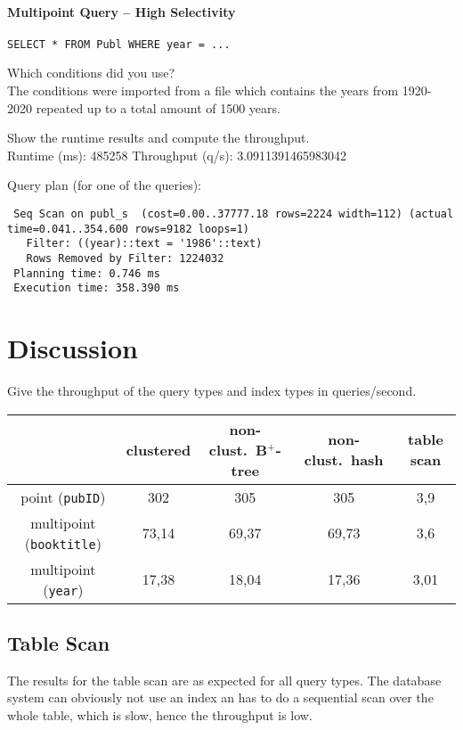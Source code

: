 \documentclass[11pt]{scrartcl}
\begin{document}
\paragraph{Multipoint Query -- High Selectivity}

{\small
\begin{verbatim}
SELECT * FROM Publ WHERE year = ...
\end{verbatim}
}

\noindent
Which conditions did you use?\\
The conditions were imported from a file which contains the years from 1920-2020 repeated up to a total amount of 1500 years.

\smallskip\noindent
Show the runtime results and compute the throughput.\\
Runtime (ms): 485258
Throughput (q/s): 3.0911391465983042

\smallskip\noindent
Query plan (for one of the queries):
{\small
\begin{verbatim}
 Seq Scan on publ_s  (cost=0.00..37777.18 rows=2224 width=112) (actual time=0.041..354.600 rows=9182 loops=1)
   Filter: ((year)::text = '1986'::text)
   Rows Removed by Filter: 1224032
 Planning time: 0.746 ms
 Execution time: 358.390 ms
\end{verbatim}
}

\section{Discussion}

Give the throughput of the query types and index types in queries/second.
\begin{center}
  \begin{tabular}{c|c|c|c|c}
    & clustered & non-clust.\ B$^+$-tree & non-clust.\ hash & table scan \\
    \hline
    point ({\tt pubID}) & 302 & 305 & 305 & 3,9 \\
    \hline
    multipoint ({\tt booktitle}) & 73,14 & 69,37 & 69,73 & 3,6\\
    \hline
    multipoint  ({\tt year}) & 17,38 & 18,04 & 17,36 & 3,01 \\  
  \end{tabular}
\end{center}

\medskip

\subsection{Table Scan}
The results for the table scan are as expected for all query types. The database system can obviously not use an index an has to do a sequential scan over the whole table, which is slow, hence the throughput is low.
\end{document}
